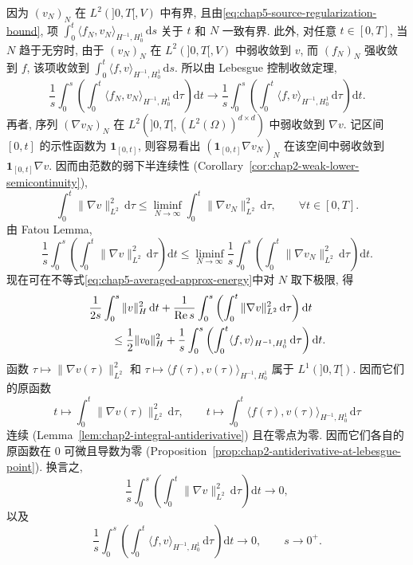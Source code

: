 \begin{itemize}
 因为 $(v_N)_N$ 在 $L^2(]0,T[,V)$ 中有界, 且由\eqref{eq:chap5-source-regularization-bound}, 项 $\int_0^t\langle f_N,v_N\rangle_{H^{-1},H_0^1}\,\mathrm ds$ 关于 $t$ 和 $N$ 一致有界. 此外, 对任意 $t\in[0,T]$, 当 $N$ 趋于无穷时, 由于 $(v_N)_N$ 在 $L^2(]0,T[,V)$ 中弱收敛到 $v$, 而 $(f_N)_N$ 强收敛到 $f$, 该项收敛到 $\int_0^t\langle f,v\rangle_{H^{-1},H_0^1}\,\mathrm ds$. 所以由 Lebesgue 控制收敛定理,
 \[
  \frac1s\int_0^s\left(\int_0^t\langle f_N,v_N\rangle_{H^{-1},H_0^1}\,\mathrm d\tau\right)\mathrm dt
  \longrightarrow
  \frac1s\int_0^s\left(\int_0^t\langle f,v\rangle_{H^{-1},H_0^1}\,\mathrm d\tau\right)\mathrm dt.
 \]
 再者, 序列 $(\nabla v_N)_N$ 在 $L^2(]0,T[,(L^2(\Omega))^{d\times d})$ 中弱收敛到 $\nabla v$. 记区间 $[0,t]$ 的示性函数为 $\mathbf1_{[0,t]}$, 则容易看出 $(\mathbf1_{[0,t]}\nabla v_N)_N$ 在该空间中弱收敛到 $\mathbf1_{[0,t]}\nabla v$. 因而由范数的弱下半连续性 (Corollary~\ref{cor:chap2-weak-lower-semicontinuity}),
 \[
  \int_0^t\|\nabla v\|_{L^2}^2\,\mathrm d\tau
  \leq\liminf_{N\to\infty}\int_0^t\|\nabla v_N\|_{L^2}^2\,\mathrm d\tau,
  \qquad\forall t\in[0,T].
 \]
 由 Fatou Lemma,
 \[
  \frac1s\int_0^s\left(\int_0^t\|\nabla v\|_{L^2}^2\,\mathrm d\tau\right)\mathrm dt
  \leq\liminf_{N\to\infty}
  \frac1s\int_0^s\left(\int_0^t\|\nabla v_N\|_{L^2}^2\,\mathrm d\tau\right)\mathrm dt.
 \]
 现在可在不等式\eqref{eq:chap5-averaged-approx-energy}中对 $N$ 取下极限, 得
 \begin{align}
  &\frac1{2s}\int_0^s\|v\|_H^2\,\mathrm dt
  +\frac1{\operatorname{Re}s}\int_0^s\left(\int_0^t\|\nabla v\|_{L^2}^2\,\mathrm d\tau\right)\mathrm dt\notag\\
  &\qquad\leq\frac12\|v_0\|_H^2
  +\frac1s\int_0^s\left(\int_0^t\langle f,v\rangle_{H^{-1},H_0^1}\,\mathrm d\tau\right)\mathrm dt.
  \label{eq:chap5-averaged-limit-energy}
 \end{align}
 函数 $\tau\mapsto\|\nabla v(\tau)\|_{L^2}^2$ 和 $\tau\mapsto\langle f(\tau),v(\tau)\rangle_{H^{-1},H_0^1}$ 属于 $L^1(]0,T[)$. 因而它们的原函数
 \[
  t\mapsto\int_0^t\|\nabla v(\tau)\|_{L^2}^2\,\mathrm d\tau,
  \qquad
  t\mapsto\int_0^t\langle f(\tau),v(\tau)\rangle_{H^{-1},H_0^1}\,\mathrm d\tau
 \]
 连续 (Lemma~\ref{lem:chap2-integral-antiderivative}) 且在零点为零. 因而它们各自的原函数在 $0$ 可微且导数为零 (Proposition~\ref{prop:chap2-antiderivative-at-lebesgue-point}). 换言之,
 \[
  \frac1s\int_0^s\left(\int_0^t\|\nabla v\|_{L^2}^2\,\mathrm d\tau\right)\mathrm dt\longrightarrow0,
 \]
以及
 \[
  \frac1s\int_0^s\left(\int_0^t\langle f,v\rangle_{H^{-1},H_0^1}\,\mathrm d\tau\right)\mathrm dt\longrightarrow0,
  \qquad s\to0^+.
\]
\end{itemize}
